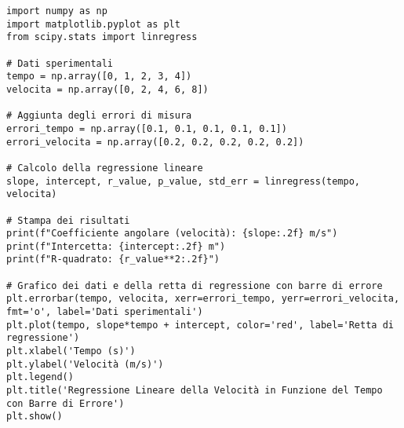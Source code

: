 \documentclass[12pt]{article}
\begin{document}
\begin{verbatim}
import numpy as np
import matplotlib.pyplot as plt
from scipy.stats import linregress

# Dati sperimentali
tempo = np.array([0, 1, 2, 3, 4])
velocita = np.array([0, 2, 4, 6, 8])

# Aggiunta degli errori di misura
errori_tempo = np.array([0.1, 0.1, 0.1, 0.1, 0.1])
errori_velocita = np.array([0.2, 0.2, 0.2, 0.2, 0.2])

# Calcolo della regressione lineare
slope, intercept, r_value, p_value, std_err = linregress(tempo, velocita)

# Stampa dei risultati
print(f"Coefficiente angolare (velocità): {slope:.2f} m/s")
print(f"Intercetta: {intercept:.2f} m")
print(f"R-quadrato: {r_value**2:.2f}")

# Grafico dei dati e della retta di regressione con barre di errore
plt.errorbar(tempo, velocita, xerr=errori_tempo, yerr=errori_velocita, fmt='o', label='Dati sperimentali')
plt.plot(tempo, slope*tempo + intercept, color='red', label='Retta di regressione')
plt.xlabel('Tempo (s)')
plt.ylabel('Velocità (m/s)')
plt.legend()
plt.title('Regressione Lineare della Velocità in Funzione del Tempo con Barre di Errore')
plt.show()
\end{verbatim}
\end{document}
